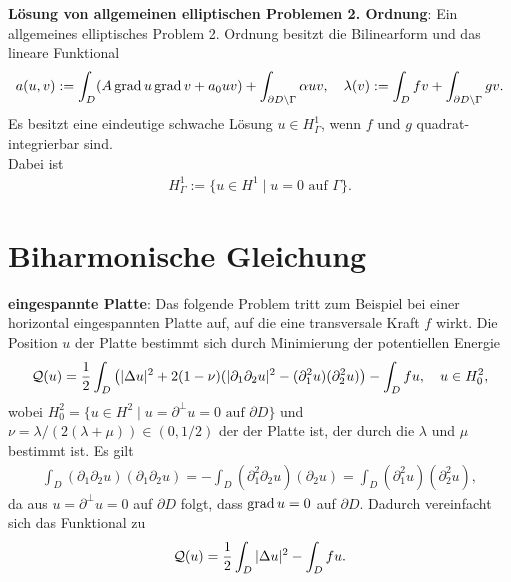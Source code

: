\linie

\textbf{Lösung von allgemeinen elliptischen Problemen 2. Ordnung}:
Ein allgemeines elliptisches Problem 2. Ordnung besitzt die Bilinearform
und das lineare Funktional
\begin{align*}
    a(u, v) := \int_D (A \operatorname{grad} u \operatorname{grad} v + a_0 uv) +
    \int_{\partial D \setminus \Gamma} \alpha uv,\quad
    \lambda(v) := \int_D fv + \int_{\partial D \setminus \Gamma} gv.
\end{align*}
Es besitzt eine eindeutige schwache Lösung $u \in H_\Gamma^1$,
wenn $f$ und $g$ quadrat-integrierbar sind.\\
Dabei ist
\begin{align*}
    H_\Gamma^1 := \{u \in H^1 \;|\; u = 0 \text{ auf } \Gamma\}.
\end{align*}

\pagebreak

\section{%
    Biharmonische Gleichung%
}

\textbf{eingespannte Platte}:
Das folgende Problem tritt zum Beispiel bei einer horizontal eingespannten Platte auf,
auf die eine transversale Kraft $f$ wirkt.
Die Position $u$ der Platte bestimmt sich durch Minimierung der potentiellen Energie
\begin{align*}
    \mathcal{Q}(u) = \frac{1}{2} \int_D \left(|\Delta u|^2 + 2(1 - \nu) (|\partial_1 \partial_2 u|^2 -
    (\partial_1^2 u) (\partial_2^2 u)\right) - \int_D fu,\quad u \in H_0^2,
\end{align*}
wobei $H_0^2 = \{u \in H^2 \;|\; u = \partial^\perp u = 0 \text{ auf } \partial D\}$ und
$\nu = \lambda/(2(\lambda + \mu)) \in (0, 1/2)$ der
 der Platte ist,
der durch die  $\lambda$ und $\mu$ bestimmt ist.
Es gilt
\begin{align*}
    \int_D (\partial_1 \partial_2 u) (\partial_1 \partial_2 u)
    = -\int_D (\partial_1^2 \partial_2 u) (\partial_2 u)
    = \int_D (\partial_1^2 u) (\partial_2^2 u),
\end{align*}
da aus $u = \partial^\perp u = 0$ auf $\partial D$ folgt, dass $\operatorname{grad} u = 0$ auf $\partial D$.
Dadurch vereinfacht sich das Funktional zu
\begin{align*}
    \mathcal{Q}(u) = \frac{1}{2} \int_D |\Delta u|^2 - \int_D fu.
\end{align*}

\linie


